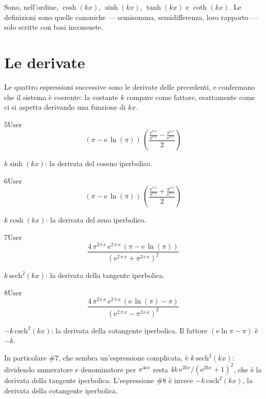 Sono, nell'ordine, $\cosh(kx)$, $\sinh(kx)$, $\tanh(kx)$ e $\coth(kx)$. Le definizioni sono quelle canoniche — semisomma, semidifferenza, loro rapporto — solo scritte con basi inconsuete.

\section{Le derivate}

Le quattro espressioni successive sono le derivate delle precedenti, e confermano che il sistema è coerente: la costante $k$ compare come fattore, esattamente come ci si aspetta derivando una funzione di $kx$.

\begin{espr}{5}{User}{}
\[
\left(\pi - \mathrm{e}\, \ln\!\left(\pi\right)\right)\, \left(\frac{\frac{\mathrm{e}^{\pi\, x}}{\pi^{\mathrm{e}\, x}} - \frac{\pi^{\mathrm{e}\, x}}{\mathrm{e}^{\pi\, x}}}{2}\right)
\]
\end{espr}
$k\sinh(kx)$: la derivata del coseno iperbolico.

\begin{espr}{6}{User}{}
\[
\left(\pi - \mathrm{e}\, \ln\!\left(\pi\right)\right)\, \left(\frac{\frac{\mathrm{e}^{\pi\, x}}{\pi^{\mathrm{e}\, x}} + \frac{\pi^{\mathrm{e}\, x}}{\mathrm{e}^{\pi\, x}}}{2}\right)
\]
\end{espr}
$k\cosh(kx)$: la derivata del seno iperbolico.

\begin{espr}{7}{User}{}
\[
\frac{4\, \pi^{2\, \mathrm{e}\, x}\, \mathrm{e}^{2\, \pi\, x}\, \left(\pi - \mathrm{e}\, \ln\!\left(\pi\right)\right)}{\left(\mathrm{e}^{2\, \pi\, x} + \pi^{2\, \mathrm{e}\, x}\right)^{2}}
\]
\end{espr}
$k\,\mathrm{sech}^2(kx)$: la derivata della tangente iperbolica.

\begin{espr}{8}{User}{}
\[
\frac{4\, \pi^{2\, \mathrm{e}\, x}\, \mathrm{e}^{2\, \pi\, x}\, \left(\mathrm{e}\, \ln\!\left(\pi\right) - \pi\right)}{\left(\mathrm{e}^{2\, \pi\, x} - \pi^{2\, \mathrm{e}\, x}\right)^{2}}
\]
\end{espr}
$-k\,\mathrm{csch}^2(kx)$: la derivata della cotangente iperbolica. Il fattore $(\mathrm{e}\ln\pi-\pi)$ è $-k$.


In particolare $\#7$, che sembra un'espressione complicata, è $k\,\mathrm{sech}^2(kx)$: dividendo numeratore e denominatore per $\pi^{4\mathrm{e}x}$ resta $4k\,\mathrm{e}^{2kx}/\left(\mathrm{e}^{2kx}+1\right)^2$, che è la derivata della tangente iperbolica. L'espressione $\#8$ è invece $-k\,\mathrm{csch}^2(kx)$, la derivata della cotangente iperbolica.

